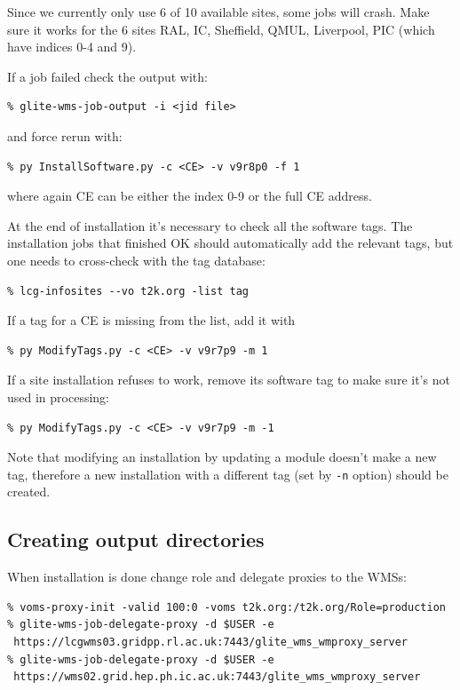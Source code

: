 \documentclass[11pt]{article}
\begin{document}
Since we currently only use 6 of 10 available sites, some jobs will
crash. Make sure it works for the 6 sites RAL, IC, Sheffield, QMUL,
Liverpool, PIC (which have indices 0-4 and 9).

If a job failed check the output with:
\begin{verbatim}
% glite-wms-job-output -i <jid file>
\end{verbatim}
and force rerun with:
\begin{verbatim}
% py InstallSoftware.py -c <CE> -v v9r8p0 -f 1
\end{verbatim}
where again CE can be either the index 0-9 or the full CE address.

At the end of installation it's necessary to check all the software
tags. The installation jobs that finished OK should automatically add
the relevant tags, but one needs to cross-check with the tag database:
\begin{verbatim}
% lcg-infosites --vo t2k.org -list tag
\end{verbatim}

If a tag for a CE is missing from the list, add it with
\begin{verbatim}
% py ModifyTags.py -c <CE> -v v9r7p9 -m 1
\end{verbatim}

If a site installation refuses to work, remove its software tag to
make sure it's not used in processing:
\begin{verbatim}
% py ModifyTags.py -c <CE> -v v9r7p9 -m -1
\end{verbatim}

Note that modifying an installation by updating a module doesn't make
a new tag, therefore a new installation with a different tag (set by
\verb+-n+ option) should be created.

\subsection{Creating output directories}

When installation is done change role and delegate proxies to the WMSs:
\begin{verbatim}
% voms-proxy-init -valid 100:0 -voms t2k.org:/t2k.org/Role=production
% glite-wms-job-delegate-proxy -d $USER -e
 https://lcgwms03.gridpp.rl.ac.uk:7443/glite_wms_wmproxy_server
% glite-wms-job-delegate-proxy -d $USER -e
 https://wms02.grid.hep.ph.ic.ac.uk:7443/glite_wms_wmproxy_server
\end{verbatim}
\end{document}
